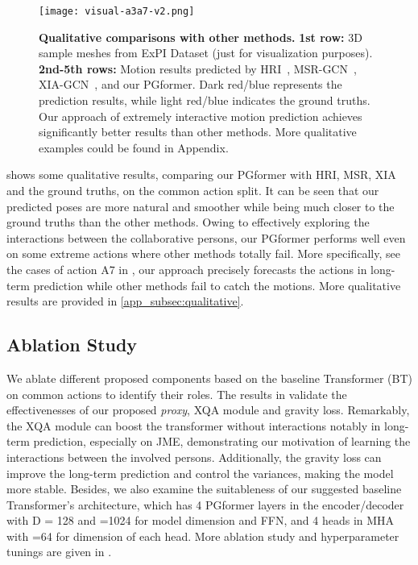 \documentclass[10pt,twocolumn,letterpaper]{article}
\begin{document}
\begin{figure*}[ht]
    \vskip -0.2in
	\begin{center}
		\centerline{\texttt{[image: visual-a3a7-v2.png]}} \caption{\textbf{Qualitative comparisons with other methods.} 
        \textbf{1st row:} 3D sample meshes from ExPI Dataset (just for visualization purposes). 
        \textbf{2nd-5th rows:} Motion results predicted by HRI~\cite{mao2020history}, MSR-GCN~\cite{dang2021msr}, XIA-GCN~\cite{guo2021multi}, and our PGformer. 
        Dark red/blue represents the prediction results, while light red/blue indicates the ground truths. 
        Our approach of extremely interactive motion prediction achieves significantly better results than other methods. 
        More qualitative examples could be found in Appendix.}
		\label{fig:visual_a3a7}
	\end{center}
  \vskip -0.4in
\end{figure*}

 shows some qualitative results, comparing our PGformer with HRI, MSR, XIA and the ground truths, on the common action split. 
It can be seen that our predicted poses are more natural and smoother while being much closer to the ground truths than the other methods. 
Owing to effectively exploring the interactions between the collaborative persons, our PGformer performs well even on some extreme actions where other methods totally fail. 
More specifically, see the cases of action A7 in , our approach precisely forecasts the actions in long-term prediction while other methods fail to catch the motions.
More qualitative results are provided in \cref{app_subsec:qualitative}.



\subsection{Ablation Study}
We ablate different proposed components based on the baseline Transformer (BT) on common actions to identify their roles.
The results in  validate the effectivenesses of our proposed \textit{proxy}, XQA module and gravity loss. 
Remarkably, the XQA module can boost the transformer without interactions notably in long-term prediction, especially on JME, demonstrating our motivation of learning the interactions between the involved persons. 
Additionally, the gravity loss can improve the long-term prediction and control the variances, making the model more stable. 
Besides, we also examine the suitableness of our suggested baseline Transformer's architecture, which has 4 PGformer layers in the encoder/decoder with D = 128 and =1024 for model dimension and FFN, and 4 heads in MHA with =64 for dimension of each head.
More ablation study and hyperparameter tunings are given in .
\end{document}

